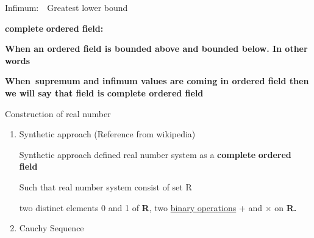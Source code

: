 \documentclass[12pt]{article}
\renewcommand{\_}{\kern-1.5pt\textunderscore\kern-1.5pt}
\begin{document}
\begin{FlushLeft}
Infimum:\ \ Greatest lower  bound 
\end{FlushLeft}\par


\vspace{\baselineskip}

\vspace{\baselineskip}
\textbf{complete} \textbf{ordered field:}\par


\vspace{\baselineskip}
\textbf{When an ordered field is bounded above and bounded below. In other words}\par

\textbf{When\ supremum and infimum  values are coming in ordered field then we will say that field is complete ordered field}\par


\vspace{\baselineskip}

\vspace{\baselineskip}
\begin{FlushLeft}
Construction of real number
\end{FlushLeft}\par


\vspace{\baselineskip}
\begin{enumerate}
	\item Synthetic approach (Reference from wikipedia)\par


\vspace{\baselineskip}
\begin{FlushLeft}
Synthetic approach defined real number system as a \textbf{complete} \textbf{ordered field} 
\end{FlushLeft}\par


\vspace{\baselineskip}
\begin{FlushLeft}
Such that real number system consist of set R {\fontsize{10pt}{12.0pt}\selectfont \textcolor[HTML]{222222}{two distinct elements 0 and 1 of \textbf{R}, two \href{https://en.wikipedia.org/wiki/Binary_operation}{binary operations} + and $ \times $  on \textbf{R.}}\par}
\end{FlushLeft}\par


\vspace{\baselineskip}

\vspace{\baselineskip}

\vspace{\baselineskip}

\vspace{\baselineskip}

\vspace{\baselineskip}
	\item Cauchy Sequence 
\end{enumerate}\par
\end{document}

